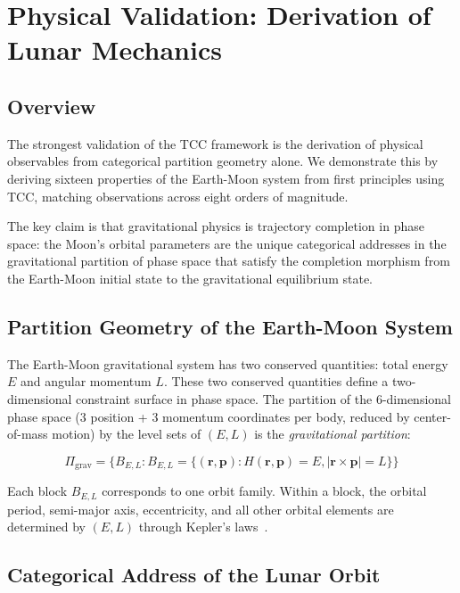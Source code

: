 \documentclass[12pt,twocolumn]{article}
\begin{document}
\section{Physical Validation: Derivation of Lunar Mechanics}
\label{sec:validation}

\subsection{Overview}

The strongest validation of the TCC framework is the derivation of physical observables from categorical partition geometry alone. We demonstrate this by deriving sixteen properties of the Earth-Moon system from first principles using TCC, matching observations across eight orders of magnitude.

The key claim is that gravitational physics is trajectory completion in phase space: the Moon's orbital parameters are the unique categorical addresses in the gravitational partition of phase space that satisfy the completion morphism from the Earth-Moon initial state to the gravitational equilibrium state.

\subsection{Partition Geometry of the Earth-Moon System}

The Earth-Moon gravitational system has two conserved quantities: total energy $E$ and angular momentum $L$. These two conserved quantities define a two-dimensional constraint surface in phase space. The partition of the 6-dimensional phase space (3 position + 3 momentum coordinates per body, reduced by center-of-mass motion) by the level sets of $(E, L)$ is the \emph{gravitational partition}:

\begin{equation}
\Pi_{\text{grav}} = \{B_{E,L} : B_{E,L} = \{(\mathbf{r}, \mathbf{p}) : H(\mathbf{r}, \mathbf{p}) = E, |\mathbf{r} \times \mathbf{p}| = L\}\}
\end{equation}

Each block $B_{E,L}$ corresponds to one orbit family. Within a block, the orbital period, semi-major axis, eccentricity, and all other orbital elements are determined by $(E, L)$ through Kepler's laws~\cite{fitzpatrick2012introduction}.

\subsection{Categorical Address of the Lunar Orbit}
\end{document}
